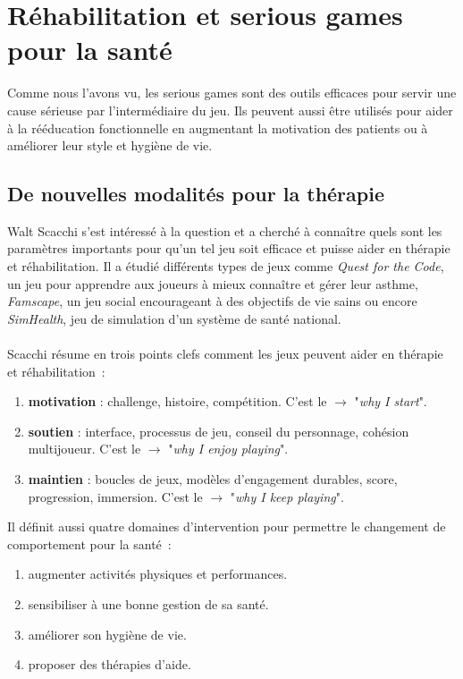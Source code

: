 \section{Réhabilitation et serious games pour la santé}
Comme nous l'avons vu, les serious games sont des outils efficaces pour servir une cause sérieuse par l'intermédiaire du jeu. Ils peuvent aussi être utilisés pour aider à la rééducation fonctionnelle en augmentant la motivation des patients ou à améliorer leur style et hygiène de vie.
		\subsection{De nouvelles modalités pour la thérapie}
Walt Scacchi\cite{Scac11} s'est intéressé à la question et a cherché à connaître quels sont les paramètres importants pour qu'un tel jeu soit efficace et puisse aider en thérapie et réhabilitation. Il a étudié différents types de jeux comme \emph{Quest for the Code}, un jeu pour apprendre aux joueurs à mieux connaître et gérer leur asthme, \emph{Famscape}, un jeu social encourageant à des objectifs de vie sains ou encore \emph{SimHealth}, jeu de simulation d'un système de santé national.

\paragraph{}
Scacchi\cite{Scac11} résume en trois points clefs comment les jeux peuvent aider en thérapie et réhabilitation~:
\begin{enumerate}
	\item \textbf{motivation }: challenge, histoire, compétition. C'est le $\rightarrow $ "\emph{why I start}".
	\item \textbf{soutien} : interface, processus de jeu, conseil du personnage, cohésion multijoueur. C'est le $\rightarrow $ "\emph{why I enjoy playing}".	
	\item \textbf{maintien} : boucles de jeux, modèles d'engagement durables, score, progression, immersion. C'est le $\rightarrow $ "\emph{why I keep playing}".
\end{enumerate}

Il définit aussi quatre domaines d'intervention pour permettre le changement de comportement pour la santé\cite{Scac11}~:
\begin{enumerate}
	\item augmenter activités physiques et performances.
	\item sensibiliser à une bonne gestion de sa santé.
	\item améliorer son hygiène de vie.
	\item proposer des thérapies d'aide.
\end{enumerate}
		
